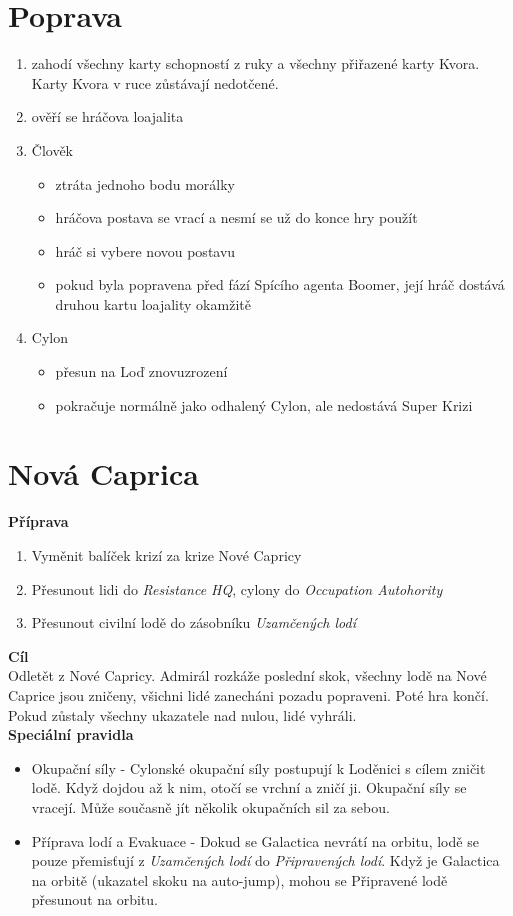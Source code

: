 \documentclass[a4paper,twocolumn]{article}
\begin{document}
\section{Poprava}
\begin{enumerate}
\item zahodí všechny karty schopností z ruky a všechny přiřazené karty Kvora. Karty Kvora v ruce zůstávají nedotčené.
\item ověří se hráčova loajalita
\item Člověk
	\begin{itemize}
	\item ztráta jednoho bodu morálky
	\item hráčova postava se vrací a nesmí se už do konce hry použít
	\item hráč si vybere novou postavu
	\item pokud byla popravena před fází Spícího agenta Boomer, její hráč dostává druhou kartu loajality okamžitě
	\end{itemize}
\item Cylon
	\begin{itemize}
	\item přesun na Loď znovuzrození
	\item pokračuje normálně jako odhalený Cylon, ale nedostává Super Krizi
	\end{itemize}
\end{enumerate}

\section{Nová Caprica}
\textbf{Příprava}
\begin{enumerate}
	\item Vyměnit balíček krizí za krize Nové Capricy
	\item Přesunout lidi do \textit{Resistance HQ}, cylony do \textit{Occupation Autohority}
	\item Přesunout civilní lodě do zásobníku \textit{Uzamčených lodí}
\end{enumerate}
\textbf{Cíl}\\
Odletět z Nové Capricy. Admirál rozkáže poslední skok, všechny lodě na Nové Caprice jsou zničeny, všichni lidé zanecháni pozadu popraveni. Poté hra končí. Pokud zůstaly všechny ukazatele nad nulou, lidé vyhráli.\\
\textbf{Speciální pravidla}
\begin{itemize}
	\item Okupační síly - Cylonské okupační síly postupují k Loděnici s cílem zničit lodě. Když dojdou až k nim, otočí se vrchní a zničí ji. Okupační síly se vracejí. Může současně jít několik okupačních sil za sebou.
	\item Příprava lodí a Evakuace - Dokud se Galactica nevrátí na orbitu, lodě se pouze přemisťují z \textit{Uzamčených lodí} do \textit{Připravených lodí}. Když je Galactica na orbitě (ukazatel skoku na auto-jump), mohou se Připravené lodě přesunout na orbitu. 
\end{itemize}
\end{document}
